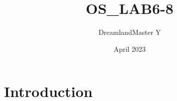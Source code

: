 \documentclass{article}
\title{OS_LAB6-8}
\author{DreamlandMaster Y}
\date{April 2023}
\begin{document}
\maketitle

\section{Introduction}
\end{document}
